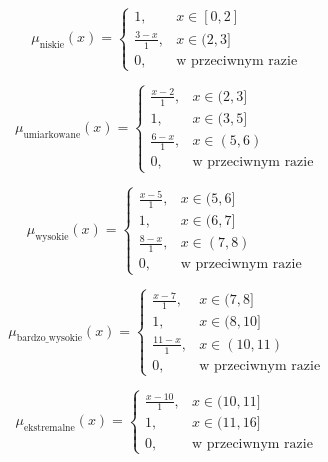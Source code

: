 \documentclass{article}
\begin{document}
\begin{enumerate}
    \begin{equation}
    \mu_{\text{niskie}}(x) =
    \begin{cases}
    1, & x \in [0, 2] \\
    \frac{3 - x}{1}, & x \in (2, 3] \\
    0, & \text{w przeciwnym razie}
    \end{cases}
    \end{equation}
    
    \begin{equation}
    \mu_{\text{umiarkowane}}(x) =
    \begin{cases}
    \frac{x - 2}{1}, & x \in (2, 3] \\
    1, & x \in (3, 5] \\
    \frac{6 - x}{1}, & x \in (5, 6) \\
    0, & \text{w przeciwnym razie}
    \end{cases}
    \end{equation}
    
    \begin{equation}
    \mu_{\text{wysokie}}(x) =
    \begin{cases}
    \frac{x - 5}{1}, & x \in (5, 6] \\
    1, & x \in (6, 7] \\
    \frac{8 - x}{1}, & x \in (7, 8) \\
    0, & \text{w przeciwnym razie}
    \end{cases}
    \end{equation}
    
    \begin{equation}
    \mu_{\text{bardzo\_wysokie}}(x) =
    \begin{cases}
    \frac{x - 7}{1}, & x \in (7, 8] \\
    1, & x \in (8, 10] \\
    \frac{11 - x}{1}, & x \in (10, 11) \\
    0, & \text{w przeciwnym razie}
    \end{cases}
    \end{equation}

    \begin{equation}
    \mu_{\text{ekstremalne}}(x) =
    \begin{cases}
    \frac{x - 10}{1}, & x \in (10, 11] \\
    1, & x \in (11, 16] \\
    0, & \text{w przeciwnym razie}
    \end{cases}
    \end{equation}


\end{enumerate}
\end{document}
